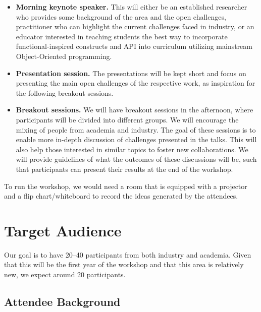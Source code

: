 \documentclass[10pt, conference]{IEEEtran}
\begin{document}
\begin{itemize}

	\item \textbf{Morning keynote speaker.} This will either be an established researcher who provides some background of the area and the open challenges, practitioner who can highlight the current challenges faced in industry, or an educator interested in teaching students the best way to incorporate functional-inspired constructs and API into curriculum utilizing mainstream Object-Oriented programming.

	\item \textbf{Presentation session.} The presentations will be kept short and focus on presenting the main open challenges of the respective work, as inspiration for the following breakout sessions.

	\item \textbf{Breakout sessions.} We will have breakout sessions in the afternoon, where participants will be divided into different groups. We will encourage the mixing of people from academia and industry. The goal of these sessions is to enable more in-depth discussion of challenges presented in the talks. This will also help those interested in similar topics to foster new collaborations. We will provide guidelines of what the outcomes of these discussions will be, such that participants can present their results at the end of the workshop.

\end{itemize}

To run the workshop, we would need a room that is equipped with a projector and a flip chart/whiteboard to record the ideas generated by the attendees.

\section{Target Audience}

Our goal is to have 20--40 participants from both industry and academia. Given that this will be the first year of the workshop and that this area is relatively new, we expect around 20 participants.

\subsection{Attendee Background} 
\end{document}

